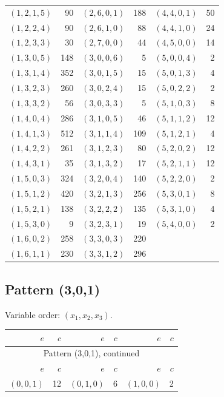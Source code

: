 \begin{longtable}{@{}rr@{\qquad}rr@{\qquad}rr@{}}
$(1,2,1,5)$&90&$(2,6,0,1)$&188&$(4,4,0,1)$&50\\
$(1,2,2,4)$&90&$(2,6,1,0)$&88&$(4,4,1,0)$&24\\
$(1,2,3,3)$&30&$(2,7,0,0)$&44&$(4,5,0,0)$&14\\
$(1,3,0,5)$&148&$(3,0,0,6)$&5&$(5,0,0,4)$&2\\
$(1,3,1,4)$&352&$(3,0,1,5)$&15&$(5,0,1,3)$&4\\
$(1,3,2,3)$&260&$(3,0,2,4)$&15&$(5,0,2,2)$&2\\
$(1,3,3,2)$&56&$(3,0,3,3)$&5&$(5,1,0,3)$&8\\
$(1,4,0,4)$&286&$(3,1,0,5)$&46&$(5,1,1,2)$&12\\
$(1,4,1,3)$&512&$(3,1,1,4)$&109&$(5,1,2,1)$&4\\
$(1,4,2,2)$&261&$(3,1,2,3)$&80&$(5,2,0,2)$&12\\
$(1,4,3,1)$&35&$(3,1,3,2)$&17&$(5,2,1,1)$&12\\
$(1,5,0,3)$&324&$(3,2,0,4)$&140&$(5,2,2,0)$&2\\
$(1,5,1,2)$&420&$(3,2,1,3)$&256&$(5,3,0,1)$&8\\
$(1,5,2,1)$&138&$(3,2,2,2)$&135&$(5,3,1,0)$&4\\
$(1,5,3,0)$&9&$(3,2,3,1)$&19&$(5,4,0,0)$&2\\
$(1,6,0,2)$&258&$(3,3,0,3)$&220&&\\
$(1,6,1,1)$&230&$(3,3,1,2)$&296&&\\
\bottomrule
\end{longtable}
\endgroup
\subsection{Pattern (3,0,1)}
Variable order: $(x_{1}, x_{2}, x_{3})$.
\begingroup\small
\setlength{\tabcolsep}{8pt}
\begin{longtable}{@{}rr@{\qquad}rr@{\qquad}rr@{}}
\toprule
$e$&$c$&$e$&$c$&$e$&$c$\\\midrule
\endfirsthead
\multicolumn{6}{c}{Pattern (3,0,1), continued}\\
\toprule
$e$&$c$&$e$&$c$&$e$&$c$\\\midrule
\endhead
$(0,0,1)$&12&$(0,1,0)$&6&$(1,0,0)$&2\\
\bottomrule
\end{longtable}
\endgroup
